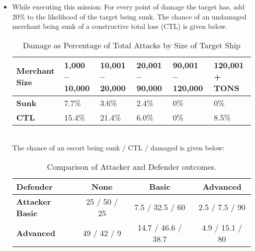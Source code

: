 \documentclass{article}
\begin{document}
\begin{itemize}
                \item{While executing this mission:}
                    For every point of damage the target has, add 20\% to the likelihood of the target being sunk. The chance of an undamaged merchant being sunk of a constructive total loss (CTL) is given below. \\
                    \begin{table}[h!]
                    \centering
                    \begin{tabularx}{\textwidth}{|X|X|X|X|X|X|}
                    \hline
                    \textbf{Merchant Size} & \textbf{1,000 – 10,000} & \textbf{10,001 – 20,000} & \textbf{20,001 – 90,000} & \textbf{90,001 – 120,000} & \textbf{120,001 + TONS} \\
                    \hline
                    \textbf{Sunk} & 7.7\% & 3.6\% & 2.4\% & 0\% & 0\% \\
                    \hline
                    \textbf{CTL} & 15.4\% & 21.4\% & 6.0\% & 0\% & 8.5\% \\
                    \hline
                    \end{tabularx}
                    \caption{Damage as Percentage of Total Attacks by Size of Target Ship}
                    \label{table:ChineseAircraftwithMissilesvsShipDamage}
                    \end{table}
                    \\ The chance of an escort being sunk / CTL / damaged is given below:\\
                    \begin{table}[h!]
                        \centering
                        \begin{tabular}{@{}lccc@{}}
                        \toprule
                        \textbf{Defender} & \textbf{None} & \textbf{Basic} & \textbf{Advanced} \\
                        \midrule
                        \textbf{Attacker} \textbf{Basic}    & 25 / 50 / 25    & 7.5 / 32.5 / 60     & 2.5 / 7.5 / 90     \\
                        \textbf{Advanced} & 49 / 42 / 9     & 14.7 / 46.6 / 38.7 & 4.9 / 15.1 / 80     \\
                        \bottomrule
                        \end{tabular}
                        \caption{Comparison of Attacker and Defender outcomes.}
                        \label{tab:Chance of a Chinese Aircraft hitting an escort ship}

\end{table}
\end{itemize}
\end{document}
